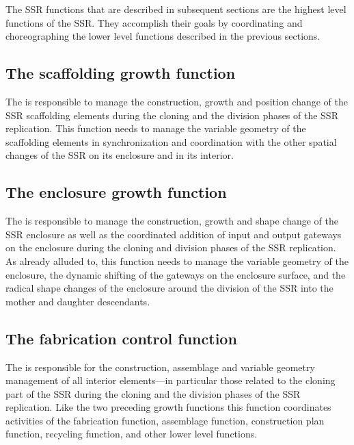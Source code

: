 The SSR functions that are
described in subsequent sections are the highest level functions of the
SSR. They accomplish their goals by coordinating and choreographing the
lower level functions described in the previous sections.

\subsection[The scaffolding growth function]{The scaffolding growth
function}

The  
is responsible to manage the construction, growth and
position change of the SSR scaffolding elements during the cloning and
the division phases of the SSR replication. This function needs to
manage the variable geometry of the scaffolding elements in
synchronization and coordination with the other spatial changes of the
SSR on its enclosure and in its interior.

\subsection[The enclosure growth function]{The enclosure growth
function}

The  is responsible to manage 
the construction, growth and shape
change of the SSR enclosure as well as the coordinated addition of
input and output gateways on the enclosure during the cloning and
division phases of the SSR replication. As already alluded to, this
function needs to manage the variable geometry of the enclosure, the
dynamic shifting of the gateways on the enclosure surface, and the
radical shape changes of the enclosure around the division of the SSR
into the mother and daughter descendants.

\subsection[The fabrication control function]{The fabrication control
function}

The  is responsible for the construction, assemblage and variable
geometry management of all interior elements---in particular those
related to the cloning part of the SSR during the cloning and the
division phases of the SSR replication.  Like the two preceding growth
functions this function coordinates activities of the fabrication
function, assemblage function, construction plan function, recycling
function, and other lower level functions. 

